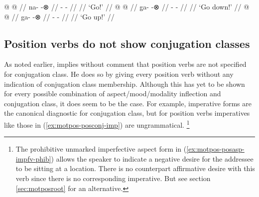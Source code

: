 \documentclass[12pt,letterpaper,oneside,article]{memoir}
\begin{document}
\pex\label{ex:motpos-motconj-nopp}%
\a\label{ex:motpos-motconj-nopp-n}%
%
\begingl
	\gla	{} @ {} @ {} //
	\glb	na-  -⊗ //
	\glc	{}-  - //
	\gld	{} {} {} //
	\glft	‘Go!’
		//
\endgl
\a\label{ex:motpos-motconj-nopp-gh}%
%
\begingl
	\gla	{} @ {} @ {} //
	\glb	g̱a-  -⊗ //
	\glc	{}-  - //
	\gld	{} {} {} //
	\glft	‘Go down!’
		//
\endgl
\a\label{ex:motpos-motconj-nopp-g}%
%
\begingl
	\gla	{} @ {} @ {} //
	\glb	ga-  -⊗ //
	\glc	{}-  - //
	\gld	{} {} {} //
	\glft	‘Go up!’
		//
\endgl
\xe

\subsection{Position verbs do not show conjugation classes}\label{sec:motpos-posconj}

As noted earlier, \textcite[71–74, 324–328]{leer:1991} implies without comment that position verbs are not specified for conjugation class.
He does so by giving every position verb without any indication of conjugation class membership.
Although this has yet to be shown for every possible combination of aspect/mood/modality inflection and conjugation class, it does seem to be the case.
For example, imperative forms are the canonical diagnostic for conjugation class, but for position verbs imperatives like those in (\ref{ex:motpos-posconj-imp}) are ungrammatical.%
\footnote{The prohibitive unmarked imperfective aspect form in (\ref{ex:motpos-posasp-impfv-phib}) allows the speaker to indicate a negative desire for the addressee to be sitting at a location.
There is no counterpart affirmative desire with this verb since there is no corresponding imperative. But see section \ref{sec:motposroot} for an alternative.}
\end{document}
